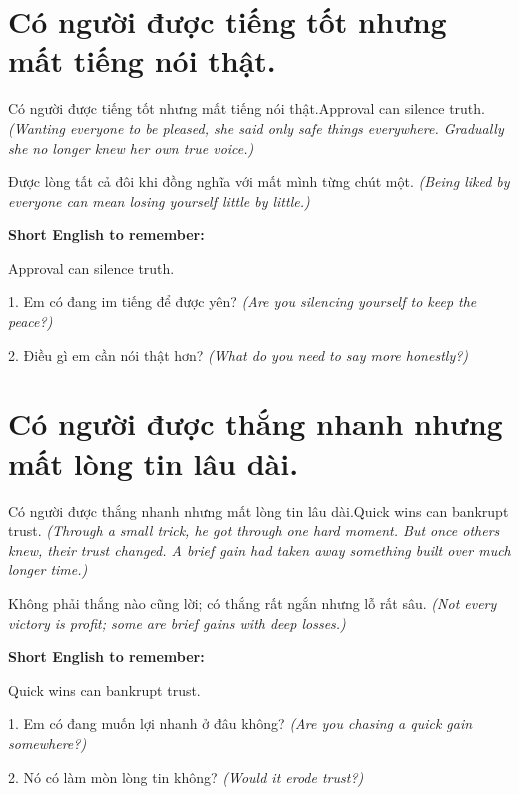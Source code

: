 \section{Có người được tiếng tốt nhưng mất tiếng nói thật.}
\begin{truyen}{Có người được tiếng tốt nhưng mất tiếng nói thật.}{Approval can silence truth.}
\textit{(Wanting everyone to be pleased, she said only safe things everywhere. Gradually she no longer knew her own true voice.)}
\end{truyen}
\begin{baihoc}
Được lòng tất cả đôi khi đồng nghĩa với mất mình từng chút một.
\textit{(Being liked by everyone can mean losing yourself little by little.)}
\end{baihoc}
\begin{ghinhoanh}\textbf{Short English to remember:}

Approval can silence truth.
\end{ghinhoanh}
\begin{tuhocnhanh}
1. Em có đang im tiếng để được yên? \textit{(Are you silencing yourself to keep the peace?)}

2. Điều gì em cần nói thật hơn? \textit{(What do you need to say more honestly?)}
\end{tuhocnhanh}
\ngancach

\section{Có người được thắng nhanh nhưng mất lòng tin lâu dài.}
\begin{truyen}{Có người được thắng nhanh nhưng mất lòng tin lâu dài.}{Quick wins can bankrupt trust.}
\textit{(Through a small trick, he got through one hard moment. But once others knew, their trust changed. A brief gain had taken away something built over much longer time.)}
\end{truyen}
\begin{baihoc}
Không phải thắng nào cũng lời; có thắng rất ngắn nhưng lỗ rất sâu.
\textit{(Not every victory is profit; some are brief gains with deep losses.)}
\end{baihoc}
\begin{ghinhoanh}\textbf{Short English to remember:}

Quick wins can bankrupt trust.
\end{ghinhoanh}
\begin{tuhocnhanh}
1. Em có đang muốn lợi nhanh ở đâu không? \textit{(Are you chasing a quick gain somewhere?)}

2. Nó có làm mòn lòng tin không? \textit{(Would it erode trust?)}
\end{tuhocnhanh}
\ngancach